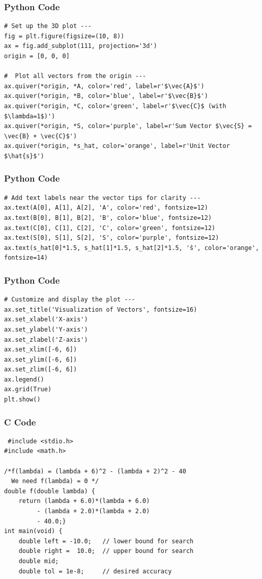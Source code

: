 \documentclass{beamer}
\begin{document}
\begin{frame}[fragile]
    \frametitle{Python Code}

    \begin{lstlisting}
# Set up the 3D plot ---
fig = plt.figure(figsize=(10, 8))
ax = fig.add_subplot(111, projection='3d')
origin = [0, 0, 0]

#  Plot all vectors from the origin ---
ax.quiver(*origin, *A, color='red', label=r'$\vec{A}$')
ax.quiver(*origin, *B, color='blue', label=r'$\vec{B}$')
ax.quiver(*origin, *C, color='green', label=r'$\vec{C}$ (with $\lambda=1$)')
ax.quiver(*origin, *S, color='purple', label=r'Sum Vector $\vec{S} = \vec{B} + \vec{C}$')
ax.quiver(*origin, *s_hat, color='orange', label=r'Unit Vector $\hat{s}$')

    \end{lstlisting}
\end{frame}

\begin{frame}[fragile]
    \frametitle{Python Code}

    \begin{lstlisting}
# Add text labels near the vector tips for clarity ---
ax.text(A[0], A[1], A[2], 'A', color='red', fontsize=12)
ax.text(B[0], B[1], B[2], 'B', color='blue', fontsize=12)
ax.text(C[0], C[1], C[2], 'C', color='green', fontsize=12)
ax.text(S[0], S[1], S[2], 'S', color='purple', fontsize=12)
ax.text(s_hat[0]*1.5, s_hat[1]*1.5, s_hat[2]*1.5, 'ŝ', color='orange', fontsize=14)
\end{lstlisting}
\end{frame}

 
\begin{frame}[fragile]
    \frametitle{Python Code}

    \begin{lstlisting}
# Customize and display the plot ---
ax.set_title('Visualization of Vectors', fontsize=16)
ax.set_xlabel('X-axis')
ax.set_ylabel('Y-axis')
ax.set_zlabel('Z-axis')
ax.set_xlim([-6, 6])
ax.set_ylim([-6, 6])
ax.set_zlim([-6, 6])
ax.legend()
ax.grid(True)
plt.show()
\end{lstlisting}
\end{frame}

\begin{frame}[fragile]
\frametitle{C Code}
\begin{lstlisting}
 #include <stdio.h>
#include <math.h>

/*f(lambda) = (lambda + 6)^2 - (lambda + 2)^2 - 40
  We need f(lambda) = 0 */
double f(double lambda) {
    return (lambda + 6.0)*(lambda + 6.0)
         - (lambda + 2.0)*(lambda + 2.0)
         - 40.0;}
int main(void) {
    double left = -10.0;   // lower bound for search
    double right =  10.0;  // upper bound for search
    double mid;
    double tol = 1e-8;     // desired accuracy
\end{lstlisting}
\end{frame}
\end{document}
